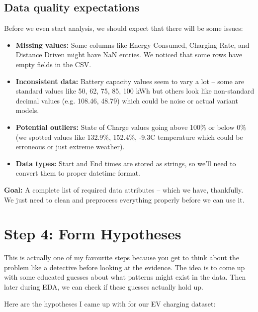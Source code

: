 \documentclass[12pt, a4paper]{article}
\begin{document}
\subsection{Data quality expectations}

Before we even start analysis, we should expect that there will be some issues:
\begin{itemize}
    \item \textbf{Missing values:} Some columns like Energy Consumed, Charging Rate, and Distance Driven might have NaN entries. We noticed that some rows have empty fields in the CSV.
    \item \textbf{Inconsistent data:} Battery capacity values seem to vary a lot -- some are standard values like 50, 62, 75, 85, 100 kWh but others look like non-standard decimal values (e.g. 108.46, 48.79) which could be noise or actual variant models.
    \item \textbf{Potential outliers:} State of Charge values going above 100\% or below 0\% (we spotted values like 132.9\%, 152.4\%, -9.3\textdegree C temperature which could be erroneous or just extreme weather).
    \item \textbf{Data types:} Start and End times are stored as strings, so we'll need to convert them to proper datetime format.
\end{itemize}

\textbf{Goal:} A complete list of required data attributes -- which we have, thankfully. We just need to clean and preprocess everything properly before we can use it.

\newpage

\section{Step 4: Form Hypotheses}

This is actually one of my favourite steps because you get to think about the problem like a detective before looking at the evidence. The idea is to come up with some educated guesses about what patterns might exist in the data. Then later during EDA, we can check if these guesses actually hold up.

Here are the hypotheses I came up with for our EV charging dataset:
\end{document}
